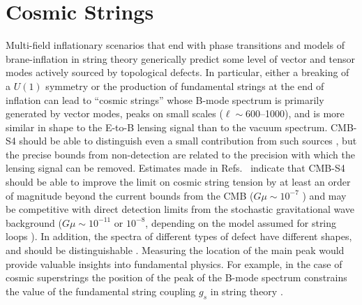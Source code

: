 \section{Cosmic Strings}

Multi-field inflationary scenarios that end with phase transitions \cite{Hindmarsh:1994re,Vilenkin:1981iu,Kofman:1995fi,Tkachev:1998dc,Jeannerot:1995yn,Jeannerot:2003qv,Rocher:2004my} and models of brane-inflation in string theory \cite{Sarangi:2002yt,Jones:2003da,Copeland:2003bj} generically predict some level of vector and tensor modes actively sourced by topological defects. In particular, either a breaking of a $U(1)$ symmetry or the production of fundamental strings at the end of inflation can lead to ``cosmic strings'' whose B-mode spectrum is primarily generated by vector modes, peaks on small scales ($\ell\sim 600$--1000), and is more similar in shape to the E-to-B lensing signal than to the vacuum spectrum. CMB-S4 should be able to distinguish even a small contribution from such sources \cite{Urrestilla:2008jv}, but the precise bounds from non-detection are related to the precision with which the lensing signal can be removed. Estimates made in Refs.~\cite{Seljak:2006hi,Avgoustidis:2011ax} indicate that CMB-S4 should be able to improve the limit on cosmic string tension by at least an order of magnitude beyond the current bounds from the CMB ($G\mu\sim10^{-7}$ \cite{Ade:2013xla,Ade:2015ava,Ade:2015xua}) and may be competitive with direct detection limits from the stochastic gravitational wave background ($G\mu\sim10^{-11}$ or $10^{-8}$, depending on the model assumed for string loops \cite{Arzoumanian:2015liz}). In addition, the spectra of different types of defect have different shapes, and should be distinguishable \cite{Urrestilla:2007sf,Avgoustidis:2011ax}. Measuring the location of the main peak would provide valuable insights into fundamental physics. For example, in the case of cosmic superstrings the position of the peak of the B-mode spectrum constrains the value of the fundamental string coupling $g_s$ in string theory \cite{Avgoustidis:2011ax}. 


